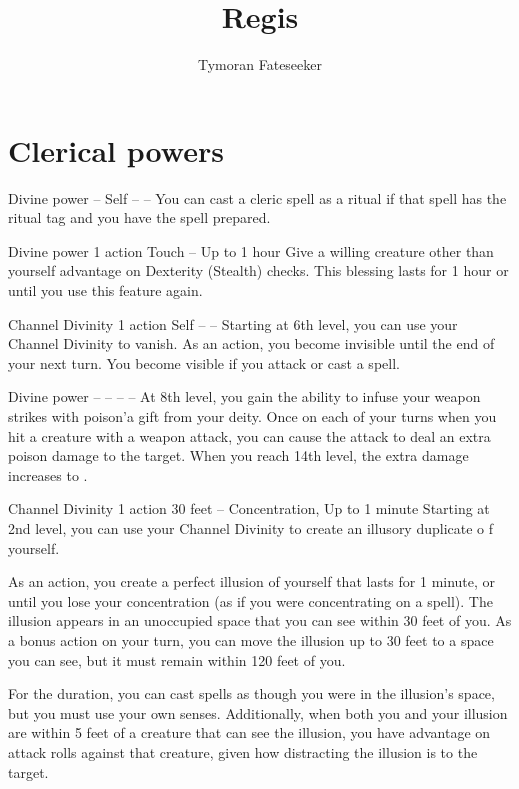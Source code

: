 \documentclass[10pt,twoside,twocolumn,openany]{book}
\begin{document}
\title{Regis}
\author{Tymoran Fateseeker}
\maketitle

\chapter{Clerical powers}
{Divine power}
{--}
{Self}
{--}
{--}
%
You can cast a cleric spell as a ritual if that spell has the ritual tag and you have the spell prepared.

{Divine power}
{\color{action} 1 action}
{Touch}
{--}
{Up to 1 hour}
%
Give a willing creature other than yourself advantage on Dexterity (Stealth) checks. This blessing lasts for 1 hour or until you use this feature again.

{Channel Divinity}
{\color{action} 1 action}
{Self}
{--}
{--}
%
Starting at 6th level, you can use your Channel Divinity to vanish.
As an action, you become invisible until the end of your next turn. You become visible if you attack or cast a spell.

{Divine power}
{--}
{--}
{--}
{--}
%
At 8th level, you gain the ability to infuse your weapon strikes with poison'a gift from your deity. Once on each of your turns when you hit a creature with a weapon attack, you can cause the attack to deal an extra  poison damage to the target. When you reach 14th level, the extra damage increases to .

{Channel Divinity}
{\color{action} 1 action}
{30 feet}
{--}
{{\color{concentration}Concentration}, Up to 1 minute}
%
Starting at 2nd level, you can use your Channel Divinity to create an illusory duplicate o f yourself.

As an action, you create a perfect illusion of yourself that lasts for 1 minute, or until you lose your concentration (as if you were concentrating on a spell). The illusion appears in an unoccupied space that you can see within 30 feet of you. As a bonus action on your turn, you can move the illusion up to 30 feet to a space you can see, but it must remain within 120 feet of you.

For the duration, you can cast spells as though you were in the illusion's space, but you must use your own senses. Additionally, when both you and your illusion are within 5 feet of a creature that can see the illusion, you have advantage on attack rolls against that creature, given how distracting the illusion is to the target.
\end{document}
